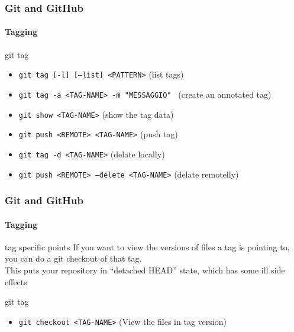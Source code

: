 \begin{frame}
	\frametitle{Git and GitHub}
    \framesubtitle{Tagging}
    \addtocounter{nframe}{1}

	\begin{block}{git tag}
		\begin{itemize}
			\item \texttt{git tag [-l] [--list] <PATTERN>} (list tags)
			\item \texttt{git tag -a <TAG-NAME> -m "MESSAGGIO" } (create an annotated tag)
			\item \texttt{git show <TAG-NAME>} (show the tag data)
			\item \texttt{git push <REMOTE> <TAG-NAME>} (push tag)
			\item \texttt{git tag -d  <TAG-NAME>} (delate locally)
			\item \texttt{git push <REMOTE> --delete <TAG-NAME>} (delate remotelly)
		\end{itemize}
	\end{block}

\end{frame}

\begin{frame}
	\frametitle{Git and GitHub}
    \framesubtitle{Tagging}
    \addtocounter{nframe}{1}

	\begin{block}{tag specific points}
		If you want to view the versions of files a tag is pointing to, you can do a git checkout of that tag.\\
		This puts your repository in “detached HEAD” state, which has some ill side effects
	\end{block}

	\begin{block}{git tag}
		\begin{itemize}
			\item \texttt{git checkout <TAG-NAME>} (View the files in tag version)
		\end{itemize}
	\end{block}
\end{frame}
